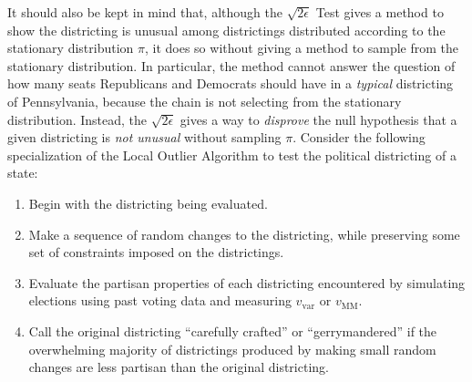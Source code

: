 \documentclass[12pt]{article}
\begin{document}
It should also be kept in mind that, although the \( \sqrt{2\epsilon} \)
Test gives a method to show the districting is unusual among
districtings distributed according to the stationary distribution \( \pi
\), it does so without giving a method to sample from the stationary
distribution.  In particular, the method cannot answer the question of
how many seats Republicans and Democrats should have in a \emph{typical}
districting of Pennsylvania, because the chain is not selecting from the
stationary distribution.  Instead, the \( \sqrt{2\epsilon} \) gives a
way to \emph{disprove} the null hypothesis that a given districting is
\emph{not unusual} without sampling \( \pi \).  Consider the following
specialization of the Local Outlier Algorithm to test the political
districting of a state:\\
\begin{enumerate}
    \item
        Begin with the districting being evaluated.
    \item
        \label{enum:serialsignificance:mcstep} Make a sequence of random
        changes to the districting, while preserving some set of
        constraints imposed on the districtings.
    \item
        Evaluate the partisan properties of each districting encountered
        by simulating elections using past voting data and measuring \(
        v_{\text {var}} \) or \( v_{\text{MM}} \).
    \item
        \label{enum:serialsignificance:crafted} Call the original
        districting ``carefully crafted'' or ``gerrymandered'' if the
        overwhelming majority of districtings produced by making small
        random changes are less partisan than the original districting.
\end{enumerate}
\end{document}
